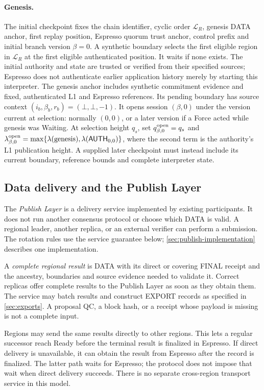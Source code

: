 \documentclass[11pt,a4paper]{article}
\newcommand{\tagg}[1]{\ensuremath{\mathsf{#1}}}
\newcommand{\defterm}[1]{\textcolor{rrBlue}{\textit{#1}}}
\newcounter{protocol}
\begin{document}
\paragraph{Genesis.}
The initial checkpoint fixes the chain identifier, cyclic order
$\mathcal L_R$, genesis DATA anchor, first replay position, Espresso
quorum trust anchor, control prefix and initial branch version $\beta=0$.
A synthetic boundary selects the first eligible region in
$\mathcal L_R$ at the first eligible authenticated position. It waits
if none exists. The initial authority and state are trusted or verified
from their specified sources; Espresso does not authenticate earlier
application history merely by starting this interpreter.
The genesis anchor includes synthetic commitment evidence and fixed,
authenticated L1 and Espresso references. Its pending boundary has
source context $(i_b,\beta_b,r_b)=(\bot,\bot,-1)$. It opens
session $(\beta,0)$ under the version current at selection: normally
$(0,0)$, or a later version if a Force acted while genesis was Waiting.
At selection height $q_s$, set $q^{\rm open}_{\beta,0}=q_s$ and
$\lambda^{\rm open}_{\beta,0}=\max\{\lambda(\text{genesis}),
\lambda(\tagg{AUTH}_{0,0})\}$, where the second term is the authority's
L1 publication height. A supplied later checkpoint must instead include
its current boundary, reference bounds and complete interpreter state.

\subsection{Data delivery and the Publish Layer}
\label{sec:delivery}
The \defterm{Publish Layer} is a delivery service implemented by existing
participants. It does not run another consensus protocol or choose which
DATA is valid. A regional leader, another replica, or an external verifier
can perform a submission. The rotation rules use the service guarantee
below; \cref{sec:publish-implementation} describes one implementation.

A \defterm{complete regional result} is DATA with its direct or covering
FINAL receipt and the ancestry, boundaries and source evidence needed to
validate it. Correct replicas offer complete results to the Publish Layer
as soon as they obtain them. The service may batch results and construct
EXPORT records as specified in \cref{sec:exports}. A proposal QC, a block
hash, or a receipt whose payload is missing is not a complete input.

Regions may send the same results directly to other regions. This lets a
regular successor reach Ready before the terminal result is finalized in
Espresso. If direct delivery is unavailable, it can obtain the result from
Espresso after the record is finalized. The latter path waits for Espresso; the
protocol does not impose that wait when direct delivery succeeds.
There is no separate cross-region transport service in this model.
\end{document}
